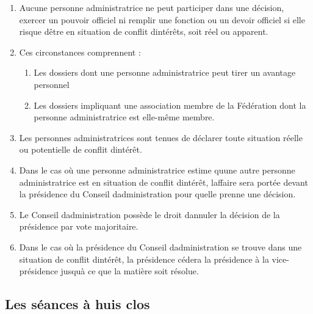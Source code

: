 \begin{enumerate}
 \item
  Aucune personne administratrice ne peut participer dans une décision, exercer un pouvoir officiel ni remplir une fonction ou un devoir officiel si elle risque d\textquotesingle être en situation de conflit d\textquotesingle intérêts, soit réel ou apparent.
 \item
  Ces circonstances comprennent :

  \begin{enumerate}
   \item
    Les dossiers dont une personne administratrice peut tirer un avantage personnel
   \item
    Les dossiers impliquant une association membre de la Fédération dont la personne administratrice est elle-même membre.
  \end{enumerate}
 \item
  Les personnes administratrices sont tenues de déclarer toute situation réelle ou potentielle de conflit d\textquotesingle intérêt.
 \item
  Dans le cas où une personne administratrice estime qu\textquotesingle une autre personne administratrice est en situation de conflit d\textquotesingle intérêt, l\textquotesingle affaire sera portée devant la présidence du Conseil d\textquotesingle administration pour qu\textquotesingle elle prenne une décision.
 \item
  Le Conseil d\textquotesingle administration possède le droit d\textquotesingle annuler la décision de la présidence par vote majoritaire.
 \item
  Dans le cas où la présidence du Conseil d\textquotesingle administration se trouve dans une situation de conflit d\textquotesingle intérêt, la présidence cédera la présidence à la vice-présidence jusqu\textquotesingle à ce que la matière soit résolue.
\end{enumerate}

\subsection{Les séances à huis clos}
\label{les-seances-a-huis-clos}

